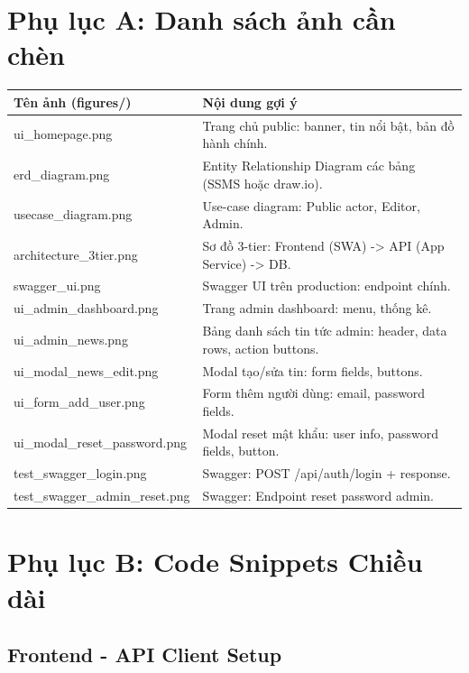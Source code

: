 \documentclass[12pt,a4paper,oneside]{report}
\begin{document}
\appendix

\chapter{Phụ lục A: Danh sách ảnh cần chèn}

\begin{longtable}{|p{}|p{}|}
\toprule
\textbf{Tên ảnh (figures/)} & \textbf{Nội dung gợi ý} \\
\midrule
ui_homepage.png & Trang chủ public: banner, tin nổi bật, bản đồ hành chính. \\
\hline
erd_diagram.png & Entity Relationship Diagram các bảng (SSMS hoặc draw.io). \\
\hline
usecase_diagram.png & Use-case diagram: Public actor, Editor, Admin. \\
\hline
architecture_3tier.png & Sơ đồ 3-tier: Frontend (SWA) -> API (App Service) -> DB. \\
\hline
swagger_ui.png & Swagger UI trên production: endpoint chính. \\
\hline
ui_admin_dashboard.png & Trang admin dashboard: menu, thống kê. \\
\hline
ui_admin_news.png & Bảng danh sách tin tức admin: header, data rows, action buttons. \\
\hline
ui_modal_news_edit.png & Modal tạo/sửa tin: form fields, buttons. \\
\hline
ui_form_add_user.png & Form thêm người dùng: email, password fields. \\
\hline
ui_modal_reset_password.png & Modal reset mật khẩu: user info, password fields, button. \\
\hline
test_swagger_login.png & Swagger: POST /api/auth/login + response. \\
\hline
test_swagger_admin_reset.png & Swagger: Endpoint reset password admin. \\
\hline
\end{longtable}

\chapter{Phụ lục B: Code Snippets Chiều dài}

\section{Frontend - API Client Setup}
\end{document}
